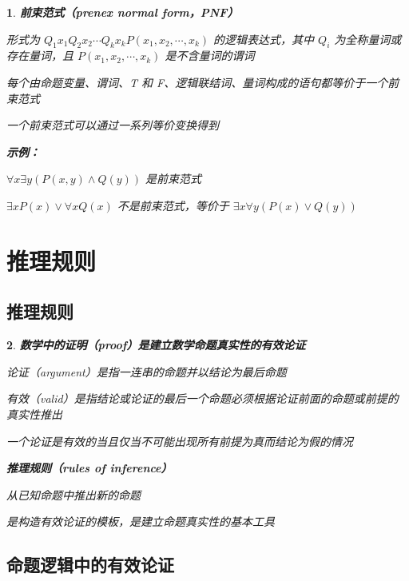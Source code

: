 \documentclass[UTF8]{report}
\theoremstyle{MyLineTheoremStyle} %
\theoremstyle{MyBlockTheoremStyle} %
\theoremstyle{MySubsubsectionStyle} %
\newtheorem{definition}{}
\begin{document}
\begin{definition}
    \textbf{前束范式（prenex normal form，PNF）}\par
    形式为 $Q_1 x_1 Q_2 x_2 \cdots Q_k x_k P(x_1, x_2, \cdots, x_k)$ 的逻辑表达式，其中 $Q_i$ 为全称量词或存在量词，且 $P(x_1, x_2, \cdots, x_k)$ 是不含量词的谓词\par
    每个由命题变量、谓词、T 和 F、逻辑联结词、量词构成的语句都等价于一个前束范式\par
    一个前束范式可以通过一系列等价变换得到\par

    \textbf{示例：}\par
    $\forall x \exists y (P(x, y) \land Q(y))$ 是前束范式\par
    $\exists x P(x) \lor \forall x Q(x)$ 不是前束范式，等价于 $\exists x \forall y (P(x) \lor Q(y))$\par
\end{definition}

\section{推理规则}

\subsection{推理规则}

\begin{definition}
    \textbf{数学中的证明（proof）是建立数学命题真实性的有效论证}\par
    论证（argument）是指一连串的命题并以结论为最后命题\par
    有效（valid）是指结论或论证的最后一个命题必须根据论证前面的命题或前提的真实性推出\par
    一个论证是有效的当且仅当不可能出现所有前提为真而结论为假的情况\par

    \textbf{推理规则（rules of inference）}\par
    从已知命题中推出新的命题\par
    是构造有效论证的模板，是建立命题真实性的基本工具\par
\end{definition}

\subsection{命题逻辑中的有效论证}
\end{document}
